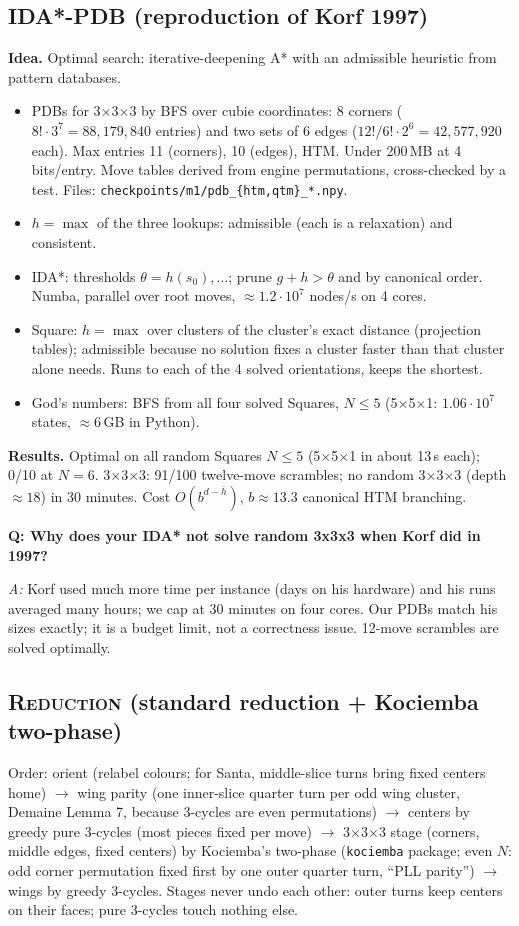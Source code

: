 \documentclass[10.5pt,a4paper]{article}
\newcommand{\Cu}[1]{#1$\times$#1$\times$#1}
\newcommand{\Sq}[1]{#1$\times$#1$\times$1}
\newcommand{\M}[1]{\textsc{#1}}
\newcommand{\Q}[1]{\par\smallskip\textbf{Q: #1}\par}
\newcommand{\A}{\textit{A:} }
\begin{document}
\subsection{\M{IDA*-PDB} (reproduction of Korf 1997)}
\textbf{Idea.} Optimal search: iterative-deepening A* with an admissible heuristic from pattern databases.
\begin{itemize}
\item PDBs for \Cu{3} by BFS over cubie coordinates: 8 corners ($8!\cdot3^7=88{,}179{,}840$ entries) and two sets of 6 edges
($12!/6!\cdot2^6=42{,}577{,}920$ each). Max entries 11 (corners), 10 (edges), HTM. Under 200\,MB at 4 bits/entry. Move tables
derived from engine permutations, cross-checked by a test. Files: \texttt{checkpoints/m1/pdb\_\{htm,qtm\}\_*.npy}.
\item $h=\max$ of the three lookups: admissible (each is a relaxation) and consistent.
\item IDA*: thresholds $\theta=h(s_0),\ldots$; prune $g+h>\theta$ and by canonical order. Numba, parallel over root moves,
$\approx1.2\cdot10^7$ nodes/s on 4 cores.
\item Square: $h=\max$ over clusters of the cluster's exact distance (projection tables); admissible because no solution fixes a
cluster faster than that cluster alone needs. Runs to each of the 4 solved orientations, keeps the shortest.
\item God's numbers: BFS from all four solved Squares, $N\le5$ (\Sq{5}: $1.06\cdot10^7$ states, $\approx$6\,GB in Python).
\end{itemize}
\textbf{Results.} Optimal on all random Squares $N\le5$ (\Sq{5} in about 13\,s each); 0/10 at $N=6$. \Cu{3}: 91/100 twelve-move
scrambles; no random \Cu{3} (depth $\approx18$) in 30 minutes. Cost $O(b^{d-\bar h})$, $b\approx13.3$ canonical HTM branching.

\Q{Why does your IDA* not solve random 3x3x3 when Korf did in 1997?}
\A Korf used much more time per instance (days on his hardware) and his runs averaged many hours; we cap at 30 minutes on four
cores. Our PDBs match his sizes exactly; it is a budget limit, not a correctness issue. 12-move scrambles are solved optimally.

\subsection{\M{Reduction} (standard reduction + Kociemba two-phase)}
Order: orient (relabel colours; for Santa, middle-slice turns bring fixed centers home) $\to$ wing parity (one inner-slice quarter
turn per odd wing cluster, Demaine Lemma 7, because 3-cycles are even permutations) $\to$ centers by greedy pure 3-cycles (most
pieces fixed per move) $\to$ \Cu{3} stage (corners, middle edges, fixed centers) by Kociemba's two-phase (\texttt{kociemba}
package; even $N$: odd corner permutation fixed first by one outer quarter turn, ``PLL parity'') $\to$ wings by greedy 3-cycles.
Stages never undo each other: outer turns keep centers on their faces; pure 3-cycles touch nothing else.
\end{document}
